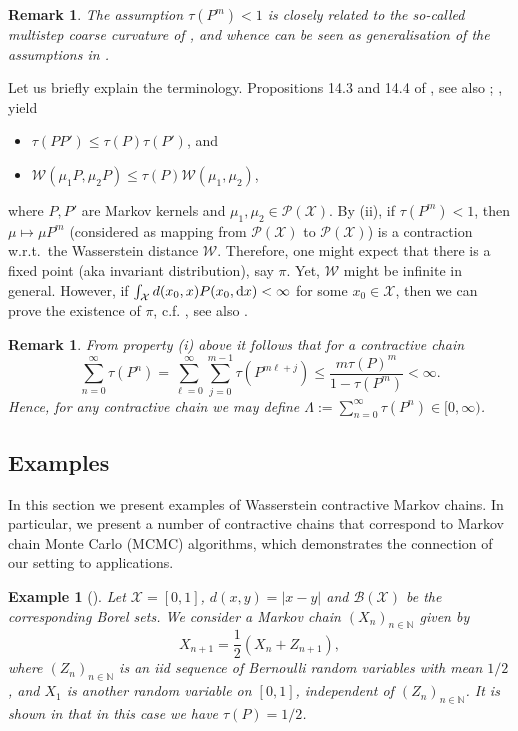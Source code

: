 \documentclass[12pt]{article}
\theoremstyle{plain}
\newtheorem{rem}[thm]{Remark}
\newtheorem{example}[thm]{Example}
\renewcommand{\d}{{\rm d}}
\newcommand{\N}{\mathbb{N}}
\newcommand{\cX}{\mathcal{X}}
\begin{document}
\begin{rem}
The assumption $\tau(P^m)<1$ is closely related to the so-called multistep coarse curvature of \cite{paulin2016mixing}, and whence can be seen as generalisation of the assumptions in \cite{ollivier2009ricci,Joulin2010Curvature}.
\end{rem}
Let us briefly explain the terminology. Propositions 14.3 and 14.4 of \cite{dobrushin96}, see also \cite[Proposition 2.1]{rudolf2018pertubation}; \cite[Proposition 20.3.3]{douc2018markov}, yield 
\begin{itemize}
	\item[(i)] $\tau(P P') \leq \tau (P) \tau (P')$, and 
	\item[(ii)]$\mathcal{W}(\mu_1 P, \mu_2 P) \leq \tau(P) \mathcal{W}(\mu_1, \mu_2)$,
\end{itemize}
where $P, P'$ are Markov kernels and $\mu_1, \mu_2 \in \mathcal{P(\cX)}$.
By (ii), if $\tau(P^m)<1$, then $\mu \mapsto \mu P^m$ (considered as mapping from $\mathcal{P(\cX)}$ to $\mathcal{P(\cX)}$) is a contraction w.r.t.~the Wasserstein distance $\mathcal{W}$. 
Therefore, one might expect that there is a fixed point (aka invariant distribution), say $\pi$. 
Yet, $\mathcal{W}$ might be infinite in general. 
However, if $\int_\cX d(x_0, x) P(x_0, \d x) < \infty$ for some $x_0 \in \cX$, then we can prove the existence of $\pi$, c.f. \cite[Theorem 20.3.4]{douc2018markov}, see also \cite{paulin2016mixing}.

\begin{rem}\label{rem:def_Lambda}
From property (i) above it follows that for a contractive chain
\[
\sum_{n=0}^\infty \tau(P^n) = \sum_{\ell=0}^\infty\sum_{j=0}^{m-1}\tau(P^{m\ell +j}) \leq \frac{m \tau(P)^m}{1-\tau(P^m)} < \infty.
\]
Hence, for any contractive chain we may define $\Lambda := \sum_{n=0}^\infty \tau(P^n) \in [0, \infty)$.
\end{rem}

\subsection{Examples}
In this section we present examples of Wasserstein contractive Markov chains. 
In particular, we present a number of contractive chains that correspond to Markov chain Monte Carlo (MCMC) algorithms, which demonstrates the connection of our setting to applications. 


\begin{example}[{\cite[Example 20.3.5]{douc2018markov}}]
	Let $\cX = [0,1]$, $ d(x,y) = \vert x-y\vert$ and $\mathcal{B}(\cX)$ be the corresponding Borel sets.
	We consider a Markov chain $(X_n)_{n \in \N}$ given by 
	\[
	X_{n+1} = \frac{1}{2}\left( X_n + Z_{n+1} \right),
	\]
	where $(Z_n)_{n \in \N}$ is an iid sequence of Bernoulli random variables with mean $1/2$, and $X_1$ is another random variable on $[0,1]$, independent of $(Z_n)_{n \in \N}$. 
	It is shown in \cite{douc2018markov} that in this case we have $\tau(P) = 1/2$.
\end{example}
\end{document}
